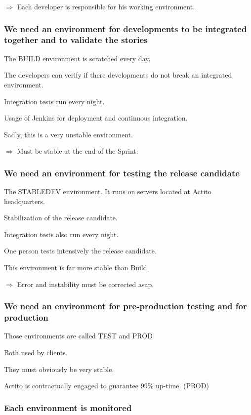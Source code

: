 \documentclass[a4paper, 11pt]{article}
\begin{document}
    $\Rightarrow$ Each developer is responsible for his working environment.

    \subsubsection{We need an environment for developments to be integrated together and to validate the stories}

    The BUILD environment is scratched every day.

    The developers can verify if there developments do not break an integrated environment.

    Integration tests run every night.

    Usage of Jenkins for deployment and continuous integration.

    Sadly, this is a very unstable environment.

    $\Rightarrow$ Must be stable at the end of the Sprint.

    \subsubsection{We need an environment for testing the release candidate}


    The STABLEDEV environment. It runs on servers located at Actito headquarters.

    Stabilization of the release candidate.

    Integration tests also run every night.

    One person tests intensively the release candidate.

    This environment is far more stable than Build.

    $\Rightarrow$ Error and instability must be corrected asap.

    \subsubsection{We need an environment for pre-production testing and for production}

    Those environments are called TEST and PROD

    Both used by clients.

    They must obviously be very stable.

    Actito is contractually engaged to guarantee 99\% up-time. (PROD)

    \subsubsection{Each environment is monitored}
\end{document}
